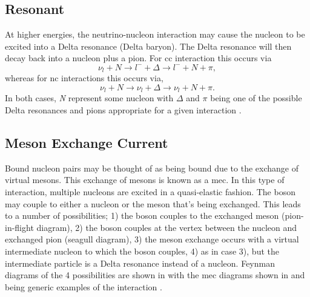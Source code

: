 \subsection*{Resonant}
At higher energies, the neutrino-nucleon interaction may cause the nucleon to be excited into a Delta resonance (Delta baryon). The Delta resonance will then decay back into a nucleon plus a pion. For \gls{cc} interaction this occurs via
\begin{equation}
    \nu_l + N \rightarrow l^- + \Delta \rightarrow l^- + N + \pi,
\end{equation}
whereas for \gls{nc} interactions this occurs via,
\begin{equation}
    \nu_l + N \rightarrow \nu_l + \Delta \rightarrow \nu_l + N +\pi.
\end{equation}
In both cases, \textit{N} represent some nucleon with $\Delta$ and $\pi$ being one of the possible Delta resonances and pions appropriate for a given interaction \cite{Measurement_of_the_Antineutrino_Double-Differential_Charged-Current_Quasi-Elastic_Scattering_Cross_Section_at_MINERvA_book} \cite{Measurement_of_the_Water_to_Scintillator_Charged-Current_Cross-Section_Ratio_for_Muon_Neutrinos_at_the_T2K_Near_Detector_thesis}. 

\subsection*{Meson Exchange Current}
Bound nucleon pairs may be thought of as being bound due to the exchange of virtual mesons. This exchange of mesons is known as a \gls{mec}. In this type of interaction, multiple nucleons are excited in a quasi-elastic fashion. The boson may couple to either a nucleon or the meson that's being exchanged. This leads to a number of possibilities; 1) the boson couples to the exchanged meson (pion-in-flight diagram), 2) the boson couples at the vertex between the nucleon and exchanged pion (seagull diagram), 3) the meson exchange occurs with a virtual intermediate nucleon to which the boson couples, 4) as in case 3), but the intermediate particle is a Delta resonance instead of a nucleon. Feynman diagrams of the 4 possibilities are shown in  with the \gls{mec} diagrams shown in  and  being generic examples of the interaction \cite{Measurement_of_the_Antineutrino_Double-Differential_Charged-Current_Quasi-Elastic_Scattering_Cross_Section_at_MINERvA_book}\cite{Adjusting_neutrino_interaction_models_and_evaluating_uncertainties_using_NOvA_near_detector_data}
\cite{Seagull_and_pion-in-flight_mec}.


